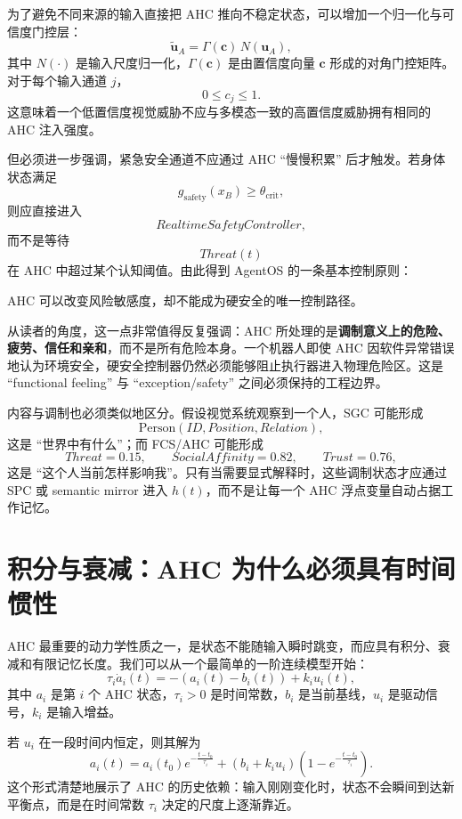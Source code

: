 为了避免不同来源的输入直接把 AHC 推向不稳定状态，可以增加一个归一化与可信度门控层：
\[
\tilde{\mathbf u}_A
=
\Gamma(\mathbf c)
\,N(\mathbf u_A),
\]
其中 $N(\cdot)$ 是输入尺度归一化，$\Gamma(\mathbf c)$ 是由置信度向量 $\mathbf c$ 形成的对角门控矩阵。对于每个输入通道 $j$，
\[
0\le c_j\le 1.
\]
这意味着一个低置信度视觉威胁不应与多模态一致的高置信度威胁拥有相同的 AHC 注入强度。

但必须进一步强调，紧急安全通道不应通过 AHC ``慢慢积累'' 后才触发。若身体状态满足
\[
g_{\mathrm{safety}}(x_B)\ge\theta_{\mathrm{crit}},
\]
则应直接进入
\[
RealtimeSafetyController,
\]
而不是等待
\[
Threat(t)
\]
在 AHC 中超过某个认知阈值。由此得到 AgentOS 的一条基本控制原则：
\begin{statementbox}
\centering
{}
\end{statementbox}
AHC 可以改变风险敏感度，却不能成为硬安全的唯一控制路径。

从读者的角度，这一点非常值得反复强调：AHC 所处理的是\textbf{调制意义上的危险、疲劳、信任和亲和}，而不是所有危险本身。一个机器人即使 AHC 因软件异常错误地认为环境安全，硬安全控制器仍然必须能够阻止执行器进入物理危险区。这是 ``functional feeling'' 与 ``exception/safety'' 之间必须保持的工程边界。

内容与调制也必须类似地区分。假设视觉系统观察到一个人，SGC 可能形成
\[
\mathrm{Person}(ID,Position,Relation),
\]
这是 ``世界中有什么''；而 FCS/AHC 可能形成
\[
Threat=0.15,\qquad
SocialAffinity=0.82,\qquad
Trust=0.76,
\]
这是 ``这个人当前怎样影响我''。只有当需要显式解释时，这些调制状态才应通过 SPC 或 semantic mirror 进入 $h(t)$，而不是让每一个 AHC 浮点变量自动占据工作记忆。


\section{积分与衰减：AHC 为什么必须具有时间惯性}

AHC 最重要的动力学性质之一，是状态不能随输入瞬时跳变，而应具有积分、衰减和有限记忆长度。我们可以从一个最简单的一阶连续模型开始：
\[
\tau_i\dot a_i(t)
=
-\left(a_i(t)-b_i(t)\right)
+
k_i u_i(t),
\]
其中 $a_i$ 是第 $i$ 个 AHC 状态，$\tau_i>0$ 是时间常数，$b_i$ 是当前基线，$u_i$ 是驱动信号，$k_i$ 是输入增益。

若 $u_i$ 在一段时间内恒定，则其解为
\[
a_i(t)
=
a_i(t_0)e^{-\frac{t-t_0}{\tau_i}}
+
\left(b_i+k_i u_i\right)
\left(
1-e^{-\frac{t-t_0}{\tau_i}}
\right).
\]
这个形式清楚地展示了 AHC 的历史依赖：输入刚刚变化时，状态不会瞬间到达新平衡点，而是在时间常数 $\tau_i$ 决定的尺度上逐渐靠近。

